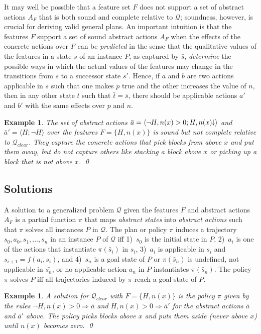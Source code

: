 \documentclass[letterpaper]{article} %
\newcommand{\tup}[1]{\langle #1 \rangle}
\newtheorem{example}[definition]{Example}
\newcommand{\Q}{\mathcal{Q}}
\newcommand{\abst}[2]{\tup{#1;#2}}
\newcommand{\Rule}[2]{\ensuremath{#1 \Rightarrow #2}}
\newcommand{\mminus}{\hspace{-.05em}\raisebox{.15ex}{\footnotesize$\downarrow$}}
\begin{document}
It may well be possible  that a  feature set $F$ does not  support a set of abstract actions $A_F$
that is both sound and complete relative to $\Q$; soundness, however, is  crucial for deriving valid general plans.
An important intuition is that the features $F$ support a set of sound abstract actions $A_F$ when the
effects of the concrete actions over $F$ can be \emph{predicted}
in the sense that the qualitative values of the features in a state $s$ of an instance $P$, 
as captured by $\bar{s}$, \emph{determine} the possible
ways in which the actual values of the features may change in the 
transitions from $s$ to a successor state $s'$.
Hence, if $a$ and $b$ are two actions applicable in $s$ such that one makes 
$p$ true and the other increases the value of $n$, then in any other state $t$ 
such that $\bar{t}=\bar{s}$,
there should be applicable actions $a'$ and $b'$ with the same effects 
over $p$ and $n$.



\begin{example}
  The set of  abstract actions  $\bar{a}=\abst{\neg H,n(x)>0}{H,n(x)\mminus}$
  and $\bar{a}'=\abst{H}{\neg H}$ over the features  $F=\{H,n(x)\}$
  is sound but not complete relative to $\Q_{clear}$. 
  They capture the concrete actions that pick blocks from above $x$ and put them away,
  but do not capture others like stacking a block above $x$ or picking up a block that is not above $x$. \qed
\end{example}


\subsection{Solutions}

A solution to a generalized problem $\Q$ given the features $F$ and abstract
actions $A_F$ is a partial function $\pi$ that maps \emph{abstract states}
into \emph{abstract actions} such that $\pi$ solves all instances $P$ in $\Q$.
The plan or policy $\pi$ induces a trajectory $s_0,a_0,s_1, \ldots, s_n$ in
an instance $P$ of $\Q$ iff
1)~$s_0$ is the initial state in $P$,
2)~$a_i$ is one of the actions that instantiate $\pi(\bar{s}_i)$ in $s_i$,
3)~$a_i$ is applicable in $s_i$ and $s_{i+1}=f(a_i,s_i)$, and
4)~$s_n$ is a goal state of $P$  or  $\pi(\bar{s}_n)$ is 
undefined,  not applicable in $\bar{s_n}$, or no applicable action $a_n$ in $P$ instantiates $\pi(\bar{s}_n)$.
The policy $\pi$ solves $P$ iff all trajectories induced by $\pi$  reach a goal state of $P$.

\begin{example}
  A solution for $\Q_{clear}$ with   $F=\{H,n(x)\}$ is the policy $\pi$ given by the rules
  $\Rule{\neg H, n(x)>0}{\bar{a}}$ and $\Rule{H, n(x)>0}{\bar{a}'}$
  for the abstract actions $\bar{a}$ and $\bar{a}'$ above.
  The policy picks blocks above $x$ and puts them aside (never  above $x$)
  until $n(x)$ becomes zero. \qed
\end{example}
\end{document}
